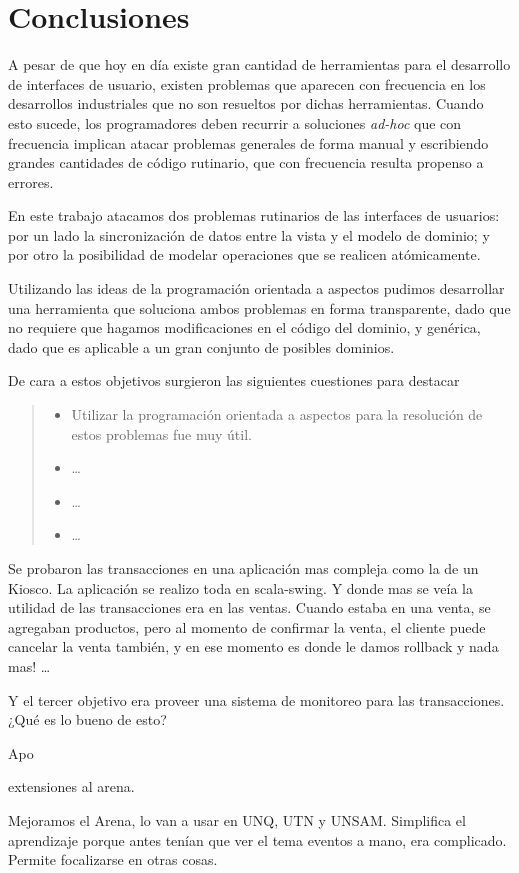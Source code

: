 \section{Conclusiones}
\label{sec:conclusions}
A pesar de que hoy en día existe gran cantidad de herramientas para el
desarrollo de interfaces de usuario, existen problemas que
aparecen con frecuencia en los desarrollos industriales que no son resueltos por
dichas herramientas.
 Cuando esto sucede, los programadores deben recurrir a soluciones \emph{ad-hoc}
que con frecuencia implican atacar problemas generales de forma manual y
escribiendo grandes cantidades de código rutinario, que con frecuencia resulta
propenso a errores.

En este trabajo atacamos dos problemas rutinarios de las interfaces de usuarios:
por un lado la sincronización de datos entre la vista y el modelo de dominio; y
por otro la posibilidad de modelar operaciones que se realicen atómicamente.

Utilizando las ideas de la programación orientada a aspectos pudimos desarrollar
una herramienta que soluciona ambos problemas en forma transparente, dado que no
requiere que hagamos modificaciones en el código del dominio, y genérica, dado
que es aplicable a un gran conjunto de posibles dominios.

De cara a estos objetivos surgieron las siguientes cuestiones para destacar

\begin{quote}

	\begin{itemize}
	  
		\item Utilizar la programación orientada a aspectos para la resolución de
		estos problemas fue muy útil.
		
		\item  \ldots
		
		\item \ldots
		\item \ldots
	  
	\end{itemize}
	
\end{quote}

Se probaron las transacciones en una aplicación mas compleja como la de un
Kiosco.
La aplicación se realizo toda en scala-swing. Y donde mas se veía la utilidad de
las transacciones era en las ventas. Cuando estaba en una venta, se agregaban
productos, pero al momento de confirmar la venta, el cliente puede cancelar la
venta también, y en ese momento es donde le damos rollback y nada mas! \ldots
{}

Y el tercer objetivo era
proveer una sistema de monitoreo para las transacciones.
¿Qué es lo bueno de esto?

Apo

extensiones al arena.

Mejoramos el Arena, lo van a usar en UNQ, UTN y UNSAM.
Simplifica el aprendizaje porque antes tenían que ver el tema eventos a mano, era
complicado. Permite focalizarse en otras cosas.
